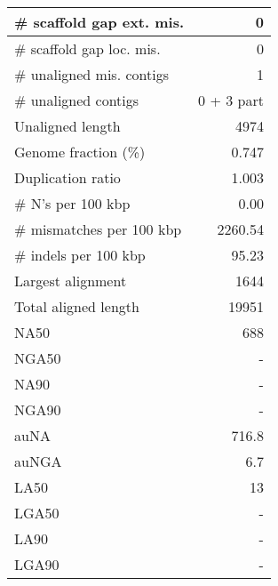 \documentclass[12pt,a4paper]{article}
\begin{document}
\begin{table}[ht]
\begin{center}
\begin{tabular}{|l*{1}{|r}|}
\# scaffold gap ext. mis. & 0 \\ \hline
\# scaffold gap loc. mis. & 0 \\ \hline
\# unaligned mis. contigs & 1 \\ \hline
\# unaligned contigs & 0 + 3 part \\ \hline
Unaligned length & 4974 \\ \hline
Genome fraction (\%) & 0.747 \\ \hline
Duplication ratio & 1.003 \\ \hline
\# N's per 100 kbp & 0.00 \\ \hline
\# mismatches per 100 kbp & 2260.54 \\ \hline
\# indels per 100 kbp & 95.23 \\ \hline
Largest alignment & 1644 \\ \hline
Total aligned length & 19951 \\ \hline
NA50 & 688 \\ \hline
NGA50 & - \\ \hline
NA90 & - \\ \hline
NGA90 & - \\ \hline
auNA & 716.8 \\ \hline
auNGA & 6.7 \\ \hline
LA50 & 13 \\ \hline
LGA50 & - \\ \hline
LA90 & - \\ \hline
LGA90 & - \\ \hline
\end{tabular}
\end{center}
\end{table}
\end{document}
